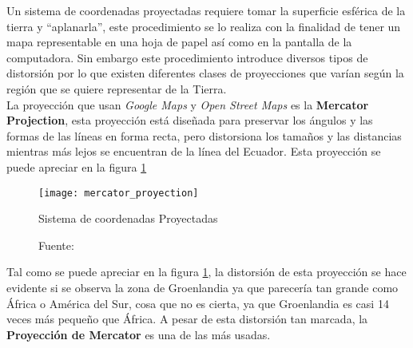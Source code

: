         Un sistema de coordenadas proyectadas requiere tomar la superficie esférica de la tierra y ``aplanarla'', este procedimiento se lo realiza con la finalidad de tener un mapa representable en una hoja de papel así como en la pantalla de la computadora. Sin embargo este procedimiento introduce diversos tipos de distorsión por lo que existen diferentes clases de proyecciones que varían según la región que se quiere representar de la Tierra.\\

        La proyección que usan \emph{Google Maps} y \emph{Open Street Maps} es la \textbf{Mercator Projection}\cite{gmaps_osm}, esta proyección está diseñada para preservar los ángulos y las formas de las líneas en forma recta, pero distorsiona los tamaños y las distancias mientras más lejos se encuentran de la línea del Ecuador. Esta proyección se puede apreciar en la figura \ref{fig:mercator_proyection}


        \begin{figure}[H]
          \begin{center}
            \texttt{[image: mercator\_proyection]}
          \end{center}
          \caption{Sistema de coordenadas Proyectadas}
          \label{fig:mercator_proyection}
          \caption*{Fuente: \cite{coords2009} }
        \end{figure}

        Tal como se puede apreciar en la figura \ref{fig:mercator_proyection}, la distorsión de esta proyección se hace evidente si se observa la zona de Groenlandia ya que parecería tan grande como África o América del Sur, cosa que no es cierta, ya que Groenlandia es casi 14 veces más pequeño que África. A pesar de esta distorsión tan marcada, la \textbf{Proyección de Mercator} es una de las más usadas.

